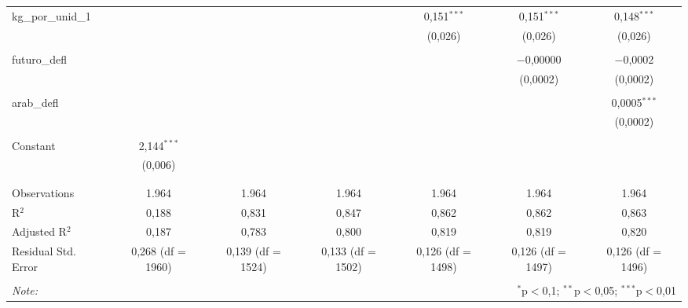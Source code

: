 \begin{table}[!htbp]
\begin{tabular}{@{\extracolsep{5pt}}lcccccc}
 kg\_por\_unid\_1 &  &  &  & 0,151$^{***}$ & 0,151$^{***}$ & 0,148$^{***}$ \\ 
  &  &  &  & (0,026) & (0,026) & (0,026) \\ 
  & & & & & & \\ 
 futuro\_defl &  &  &  &  & $-$0,00000 & $-$0,0002 \\ 
  &  &  &  &  & (0,0002) & (0,0002) \\ 
  & & & & & & \\ 
 arab\_defl &  &  &  &  &  & 0,0005$^{***}$ \\ 
  &  &  &  &  &  & (0,0002) \\ 
  & & & & & & \\ 
 Constant & 2,144$^{***}$ &  &  &  &  &  \\ 
  & (0,006) &  &  &  &  &  \\ 
  & & & & & & \\ 
\hline \\[-1.8ex] 
Observations & 1.964 & 1.964 & 1.964 & 1.964 & 1.964 & 1.964 \\ 
R$^{2}$ & 0,188 & 0,831 & 0,847 & 0,862 & 0,862 & 0,863 \\ 
Adjusted R$^{2}$ & 0,187 & 0,783 & 0,800 & 0,819 & 0,819 & 0,820 \\ 
Residual Std. Error & 0,268 (df = 1960) & 0,139 (df = 1524) & 0,133 (df = 1502) & 0,126 (df = 1498) & 0,126 (df = 1497) & 0,126 (df = 1496) \\ 
\hline 
\hline \\[-1.8ex] 
\textit{Note:}  & \multicolumn{6}{r}{$^{*}$p$<$0,1; $^{**}$p$<$0,05; $^{***}$p$<$0,01} \\ 
\end{tabular} 
\end{table} 
